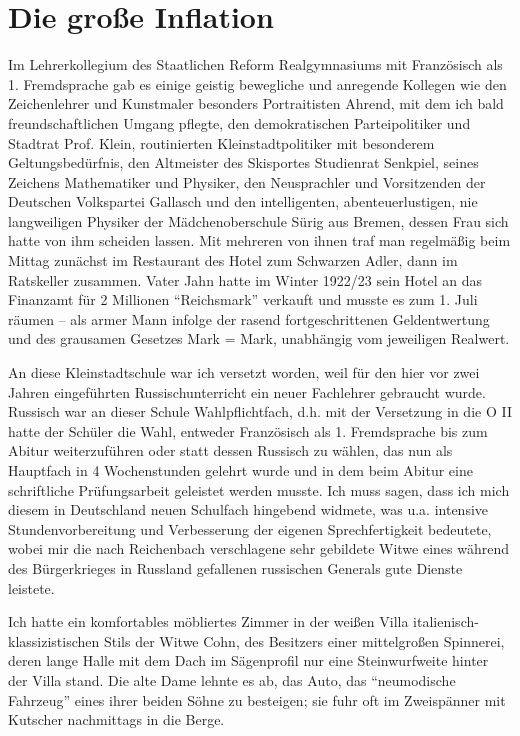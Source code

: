 \section{Die große Inflation}
Im Lehrerkollegium des Staatlichen Reform Realgymnasiums mit Französisch als 1. Fremdsprache gab es einige geistig bewegliche und anregende Kollegen wie den Zeichenlehrer und Kunstmaler besonders Portraitisten Ahrend, mit dem ich bald freundschaftlichen Umgang pflegte, den demokratischen Parteipolitiker und Stadtrat Prof. Klein, routinierten Kleinstadtpolitiker mit besonderem Geltungsbedürfnis, den Altmeister des Skisportes Studienrat Senkpiel, seines Zeichens Mathematiker und Physiker, den Neusprachler und Vorsitzenden der Deutschen Volkspartei Gallasch und den intelligenten, abenteuerlustigen, nie langweiligen Physiker der Mädchenoberschule Sürig aus Bremen, dessen Frau sich hatte von ihm scheiden lassen. Mit mehreren von ihnen traf man regelmäßig beim Mittag zunächst im Restaurant des Hotel zum Schwarzen Adler, dann im Ratskeller zusammen. Vater Jahn hatte im Winter 1922/23 sein Hotel an das Finanzamt für 2 Millionen \enquote{Reichsmark} verkauft und musste es zum 1. Juli räumen -- als armer Mann infolge der rasend fortgeschrittenen Geldentwertung und des grausamen Gesetzes Mark = Mark, unabhängig vom jeweiligen Realwert.

An diese Kleinstadtschule war ich versetzt worden, weil für den hier vor zwei Jahren eingeführten Russischunterricht ein neuer Fachlehrer gebraucht wurde. Russisch war an dieser Schule Wahlpflichtfach, d.h. mit der Versetzung in die O II hatte der Schüler die Wahl, entweder Französisch als 1. Fremdsprache bis zum Abitur weiterzuführen oder statt dessen Russisch zu wählen, das nun als Hauptfach in 4 Wochenstunden gelehrt wurde und in dem beim Abitur eine schriftliche Prüfungsarbeit geleistet werden musste. Ich muss sagen, dass ich mich diesem in Deutschland neuen Schulfach hingebend widmete, was u.a. intensive Stundenvorbereitung und Verbesserung der eigenen Sprechfertigkeit bedeutete, wobei mir die nach Reichenbach verschlagene sehr gebildete Witwe eines während des Bürgerkrieges in Russland gefallenen russischen Generals gute Dienste leistete.

Ich hatte ein komfortables möbliertes Zimmer in der weißen Villa italienisch-klassizistischen Stils der Witwe Cohn, des Besitzers einer mittelgroßen Spinnerei, deren lange Halle mit dem Dach im Sägenprofil nur eine Steinwurfweite hinter der Villa stand. Die alte Dame lehnte es ab, das Auto, das \enquote{neumodische Fahrzeug} eines ihrer beiden Söhne zu besteigen; sie fuhr oft im Zweispänner mit Kutscher nachmittags in die Berge.

